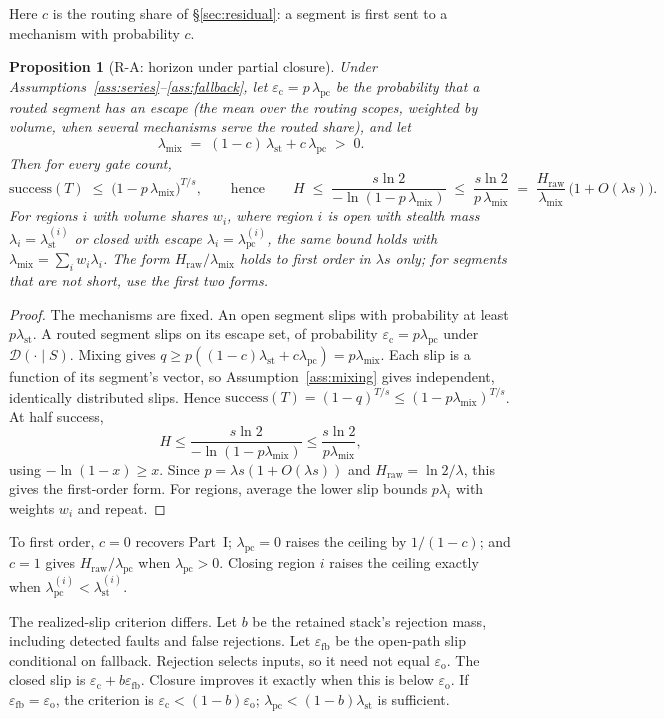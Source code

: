\documentclass[11pt]{article}
\newtheorem{proposition}{Proposition}
\theoremstyle{definition}
\theoremstyle{remark}
\newcommand{\lst}{\lambda_{\mathrm{st}}}
\newcommand{\Hraw}{H_{\mathrm{raw}}}
\newcommand{\lpc}{\lambda_{\mathrm{pc}}}
\newcommand{\lmix}{\lambda_{\mathrm{mix}}}
\newcommand{\eop}{\varepsilon_{\mathrm{o}}}
\newcommand{\ecl}{\varepsilon_{\mathrm{c}}}
\newcommand{\D}{\mathcal{D}}
\begin{document}
Here $c$ is the routing share of \S\ref{sec:residual}: a segment is first sent to a mechanism with
probability $c$.

\begin{proposition}[R-A: horizon under partial closure]\label{prop:ra}
Under Assumptions~\ref{ass:series}--\ref{ass:fallback}, let $\ecl=p\,\lpc$ be the probability that
a routed segment has an escape (the mean over the routing scopes, weighted by volume, when several
mechanisms serve the routed share), and let
\[
\lmix\;=\;(1-c)\,\lst+c\,\lpc\;>\;0 .
\]
Then for every gate count,
\[
\mathrm{success}(T)\;\le\;\bigl(1-p\,\lmix\bigr)^{T/s},
\qquad\text{hence}\qquad
H\;\le\;\frac{s\ln 2}{-\ln(1-p\,\lmix)}\;\le\;\frac{s\ln 2}{p\,\lmix}\;=\;\frac{\Hraw}{\lmix}\,\bigl(1+O(\lambda s)\bigr).
\]
For regions $i$ with volume shares $w_i$, where region $i$ is open with stealth mass $\lambda_i=\lst^{(i)}$
or closed with escape $\lambda_i=\lpc^{(i)}$, the same bound holds with $\lmix=\sum_i w_i\lambda_i$.
The form $\Hraw/\lmix$ holds to first order in $\lambda s$ only; for segments that are not short,
use the first two forms.
\end{proposition}
\begin{proof}
The mechanisms are fixed. An open segment slips with probability at least $p\lst$.
A routed segment slips on its escape set, of probability $\ecl=p\lpc$ under
$\D(\cdot\mid S)$. Mixing gives $q\ge p((1-c)\lst+c\lpc)=p\lmix$.
Each slip is a function of its segment's vector, so Assumption~\ref{ass:mixing} gives independent,
identically distributed slips. Hence $\mathrm{success}(T)=(1-q)^{T/s}\le(1-p\lmix)^{T/s}$.
At half success,
\[
H\le\frac{s\ln2}{-\ln(1-p\lmix)}\le\frac{s\ln2}{p\lmix},
\]
using $-\ln(1-x)\ge x$. Since $p=\lambda s(1+O(\lambda s))$ and
$\Hraw=\ln2/\lambda$, this gives the first-order form.
For regions, average the lower slip bounds $p\lambda_i$ with weights $w_i$ and repeat.
\end{proof}

To first order, $c=0$ recovers Part~I; $\lpc=0$ raises the ceiling by $1/(1-c)$;
and $c=1$ gives $\Hraw/\lpc$ when $\lpc>0$.
Closing region $i$ raises the ceiling exactly when $\lpc^{(i)}<\lst^{(i)}$.

The realized-slip criterion differs. Let $b$ be the retained stack's rejection mass, including
detected faults and false rejections. Let $\varepsilon_{\mathrm{fb}}$ be the open-path slip
conditional on fallback. Rejection selects inputs, so it need not equal $\eop$.
The closed slip is $\ecl+b\varepsilon_{\mathrm{fb}}$.
Closure improves it exactly when this is below $\eop$.
If $\varepsilon_{\mathrm{fb}}=\eop$, the criterion is $\ecl<(1-b)\eop$;
$\lpc<(1-b)\lst$ is sufficient.
\end{document}
